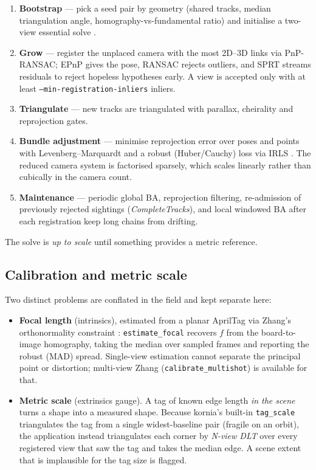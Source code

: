 \documentclass[11pt,a4paper]{article}
\newcommand{\code}[1]{\texttt{#1}}
\begin{document}
\begin{enumerate}[leftmargin=1.5em]
\item \textbf{Bootstrap} --- pick a seed pair by geometry (shared tracks, median triangulation
angle, homography-vs-fundamental ratio) and initialise a two-view essential solve
\cite{hartley2004}.
\item \textbf{Grow} --- register the unplaced camera with the most 2D--3D links via PnP-RANSAC;
EPnP \cite{lepetit2009} gives the pose, RANSAC rejects outliers, and SPRT \cite{wald1945}
streams residuals to reject hopeless hypotheses early. A view is accepted only with at least
\code{--min-registration-inliers} inliers.
\item \textbf{Triangulate} --- new tracks are triangulated with parallax, cheirality and
reprojection gates.
\item \textbf{Bundle adjustment} --- minimise reprojection error over poses and points with
Levenberg--Marquardt and a robust (Huber/Cauchy) loss via IRLS
\cite{triggs2000,lourakis2009}. The reduced camera system is factorised sparsely, which scales
linearly rather than cubically in the camera count.
\item \textbf{Maintenance} --- periodic global BA, reprojection filtering, re-admission of
previously rejected sightings (\emph{CompleteTracks}), and local windowed BA after each
registration keep long chains from drifting.
\end{enumerate}

The solve is \emph{up to scale} until something provides a metric reference.

\subsection{Calibration and metric scale}
\label{sec:scale}

Two distinct problems are conflated in the field and kept separate here:

\begin{itemize}[leftmargin=1.5em]
\item \textbf{Focal length} (intrinsics), estimated from a planar AprilTag \cite{olson2011}
via Zhang's orthonormality constraint \cite{zhang2000}: \code{estimate\_focal} recovers $f$
from the board-to-image homography, taking the median over sampled frames and reporting the
robust (MAD) spread. Single-view estimation cannot separate the principal point or distortion;
multi-view Zhang (\code{calibrate\_multishot}) is available for that.
\item \textbf{Metric scale} (extrinsics gauge). A tag of known edge length \emph{in the scene}
turns a shape into a measured shape. Because kornia's built-in \code{tag\_scale} triangulates
the tag from a single widest-baseline pair (fragile on an orbit), the application instead
triangulates each corner by \emph{N-view DLT} over every registered view that saw the tag and
takes the median edge. A scene extent that is implausible for the tag size is flagged.
\end{itemize}
\end{document}

